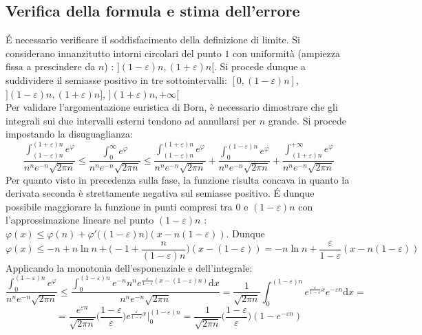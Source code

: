 \documentclass[10pt, oneside]{book}
\theoremstyle{plain}
\begin{document}
\subsection{Verifica della formula e stima dell'errore}
\'E necessario verificare il soddisfacimento della definizione di limite. Si considerano innanzitutto intorni circolari del punto $1$ con uniformità (ampiezza fissa a prescindere da $n$) : $](1-\varepsilon)n , (1+\varepsilon) n[$. Si procede dunque a suddividere il semiasse positivo in tre sottointervalli: $[0, (1-\varepsilon)n]$, $](1-\varepsilon)n, (1+\varepsilon)n]$, $](1+\varepsilon)n, + \infty[$
\\Per validare l'argomentazione euristica di Born, è necessario dimostrare che gli integrali sui due intervalli esterni tendono ad annullarsi per $n$ grande. Si procede impostando la disuguaglianza:
\[\frac{\displaystyle \int_{(1 - \varepsilon) n}^{(1+\varepsilon)n} e^\varphi}{n^n e^{-n} \sqrt{2\pi n}} \leq \frac{\displaystyle \int_{0}^{\infty} e^\varphi}{n^n e^{-n} \sqrt{2\pi n}} \leq \frac{\displaystyle \int_{(1 - \varepsilon) n}^{(1+\varepsilon)n} e^\varphi}{n^n e^{-n} \sqrt{2\pi n}} + \frac{\displaystyle \int_{0}^{(1-\varepsilon)n} e^\varphi}{n^n e^{-n} \sqrt{2\pi n}} + \frac{\displaystyle \int_{(1 + \varepsilon) n}^{+\infty} e^\varphi}{n^n e^{-n} \sqrt{2\pi n}}\]
Per quanto visto in precedenza sulla fase, la funzione risulta concava in quanto la derivata seconda è strettamente negativa sul semiasse positivo. \'E dunque possibile maggiorare la funzione in punti compresi tra $0$ e $(1-\varepsilon) n$ con l'approssimazione lineare nel punto $(1 - \varepsilon ) n$ : $\displaystyle \varphi(x) \leq \varphi(n) + \varphi'\big((1 - \varepsilon) n\big) (x - n(1 - \varepsilon))$. Dunque
\[\varphi(x) \leq -n + n\ln n + \bigg(- 1 + \frac{n}{(1 - \varepsilon) n}\bigg) (x - (1 - \varepsilon) ) = - n\ln n + \frac{\varepsilon}{1 - \varepsilon}(x - n (1 - \varepsilon))\]
Applicando la monotonìa dell'esponenziale e dell'integrale:
\[\frac{\displaystyle \int_{0}^{(1-\varepsilon)n} e^\varphi}{n^n e^{-n} \sqrt{2\pi n}} \leq \frac{\displaystyle \int_{0}^{(1-\varepsilon)n} e^{-n} n^n e^{\displaystyle \frac{\varepsilon}{1 - \varepsilon}(x - (1 - \varepsilon) n)} \textrm{d}x}{n^n e^{-n} \sqrt{2\pi n}} = \frac{1}{\sqrt{2\pi n}}\int_{0}^{(1-\varepsilon)n} e^{\displaystyle \frac{\varepsilon}{1 - \varepsilon}x} e^{-\varepsilon n} \textrm{d}x =\] \[=\frac{e^{\varepsilon n}}{\sqrt{2 \pi n}} \big(\frac{1 - \varepsilon}{\varepsilon}\big) e^{\displaystyle \frac{\varepsilon}{1 - \varepsilon} x} \bigg|_0^{(1 - \varepsilon) n} = \frac{1}{\sqrt{2 \pi n}} \big(\frac{1 - \varepsilon}{\varepsilon}\big) (1 - e^{-\varepsilon n})\]
\end{document}
